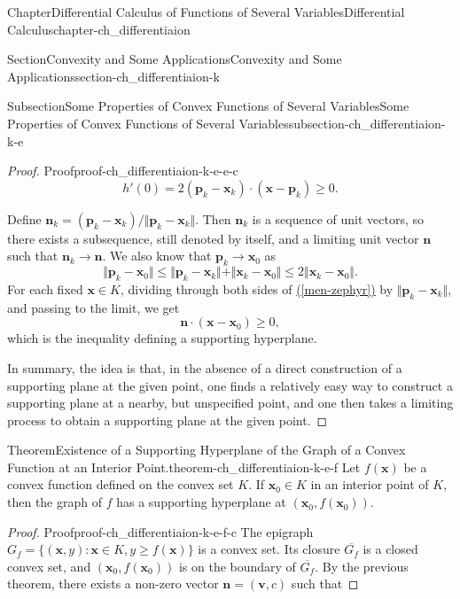 \documentclass[oneside,10pt,]{book}
\newcommand{\xreffont}{\relax}
\numberwithin{equation}{section}
\begin{document}
\begin{chapterptx}{Chapter}{Differential Calculus of Functions of Several Variables}{}{Differential Calculus}{}{}{chapter-ch_differentiaion}
\begin{sectionptx}{Section}{Convexity and Some Applications}{}{Convexity and Some Applications}{}{}{section-ch_differentiaion-k}
\begin{subsectionptx}{Subsection}{Some Properties of Convex Functions of Several Variables}{}{Some Properties of Convex Functions of Several Variables}{}{}{subsection-ch_differentiaion-k-e}
\begin{proof}{Proof}{}{proof-ch_differentiaion-k-e-e-c}
\begin{equation*}
h'(0)=2 (\mathbf p_{k}- \mathbf x_{k})\cdot (\mathbf x - \mathbf p_{k})\ge 0.
\end{equation*}
%
\par
Define \(\mathbf n_{k}=(\mathbf p_{k}- \mathbf x_{k})/\Vert \mathbf p_{k}- \mathbf x_{k}\Vert\). Then \(\mathbf n_{k}\) is a sequence of unit vectors, so there exists a subsequence, still denoted by itself, and a limiting unit vector \(\mathbf n\) such that \(\mathbf n_{k}\to \mathbf n\). We also know that \(\mathbf p_{k} \to \mathbf x_{0}\) as%
\begin{equation*}
\Vert \mathbf p_{k} - \mathbf x_{0} \Vert \le \Vert \mathbf p_{k} - \mathbf x_{k} \Vert 
+ \Vert \mathbf x_{k} - \mathbf x_{0} \Vert \le 2 \Vert \mathbf x_{k}-\mathbf x_{0} \Vert.
\end{equation*}
For  each fixed \(\mathbf x \in K\),  dividing through both sides of \hyperref[men-zephyr]{({\xreffont\ref{men-zephyr}})}  by \(\Vert \mathbf p_{k}- \mathbf x_{k}\Vert\), and passing to the limit, we get%
\begin{equation*}
\mathbf n \cdot ( \mathbf x - \mathbf x_{0}) \ge 0,
\end{equation*}
which is the inequality defining a supporting hyperplane.%
\par
In summary, the idea is  that, in the absence of a direct construction of a supporting plane at the given point, one finds a relatively easy way to construct a supporting plane at a nearby, but unspecified point, and one then takes a limiting process to obtain a supporting plane at the given point.%
\end{proof}
\begin{theorem}{Theorem}{Existence of a Supporting Hyperplane of the Graph of a Convex Function at an Interior Point.}{}{theorem-ch_differentiaion-k-e-f}%
Let \(f(\mathbf x) \) be a convex function defined on the convex set \(K\). If \(\mathbf x_{0}\in K\) in an interior point of \(K\), then the graph of \(f\) has a  supporting hyperplane at \((\mathbf x_{0}, f(\mathbf x_{0}))\).%
\end{theorem}
\begin{proof}{Proof}{}{proof-ch_differentiaion-k-e-f-c}
The epigraph \(G_{f}=\{(\mathbf x, y):\mathbf x\in K, y\ge f(\mathbf x)\}\) is a  convex set. Its closure \(\overline{G_{f}}\) is a closed convex set, and \((\mathbf x_{0}, f(\mathbf x_{0}))\) is on the boundary of \(\overline{G_{f}}\). By the previous theorem, there exists a non-zero vector \(\mathbf n=(\mathbf v, c)\) such that%

\end{proof}
\end{subsectionptx}
\end{sectionptx}
\end{chapterptx}
\end{document}
